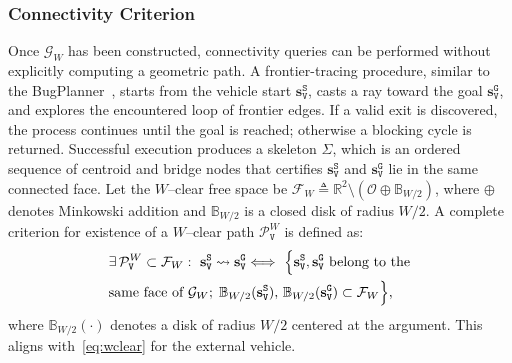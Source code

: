 \subsubsection{Connectivity Criterion}\label{subsubsec:bugplanner}
Once $\mathcal{G}_W$ has been constructed, connectivity queries can be
performed without explicitly computing a geometric path. A frontier-tracing
procedure, similar to the BugPlanner~\cite{McGuireCroonTuyls2019}, starts from the vehicle start
$\mathbf{s}_\texttt{V}^{\texttt{S}}$, casts a ray toward the goal
$\mathbf{s}_\texttt{V}^{\texttt{G}}$, and explores the encountered loop of
frontier edges. If a valid exit is discovered, the process continues until the
goal is reached; otherwise a blocking cycle is returned. Successful execution
produces a skeleton $\Sigma$, which is an ordered sequence of centroid and
bridge nodes that certifies $\mathbf{s}_\texttt{V}^{\texttt{S}}$ and
$\mathbf{s}_\texttt{V}^{\texttt{G}}$ lie in the same connected face.
Let the $W$--clear free space be
$\mathcal{F}_W\triangleq\mathbb{R}^2\setminus(\mathcal{O}\oplus\mathbb{B}_{W/2})$,
where $\oplus$ denotes Minkowski addition and $\mathbb{B}_{W/2}$ is a closed
disk of radius $W/2$. A complete criterion for existence of a $W$--clear path
$\mathcal{P}^W_\texttt{V}$ is defined as:
\begin{equation}\label{eq:wccg_criterion}
\begin{aligned}
&\exists\,\mathcal{P}^W_\texttt{V}\subset\mathcal{F}_W:\
  \mathbf{s}_\texttt{V}^{\texttt{S}}\leadsto\mathbf{s}_\texttt{V}^{\texttt{G}} \Longleftrightarrow\
  \Big{\{}\mathbf{s}_\texttt{V}^{\texttt{S}},\mathbf{s}_\texttt{V}^{\texttt{G}}
  \ \text{belong to the} \\
  & \text{same face of }\mathcal{G}_W; \;\mathbb{B}_{W/2}(\mathbf{s}_\texttt{V}^{\texttt{S}}),
  \,\mathbb{B}_{W/2}(\mathbf{s}_\texttt{V}^{\texttt{G}})\subset\mathcal{F}_W\Big{\}},
\end{aligned}
\end{equation}
where $\mathbb{B}_{W/2}(\cdot)$ denotes a disk of radius $W/2$ centered at the
argument. This aligns with~\eqref{eq:wclear} for the external vehicle.

